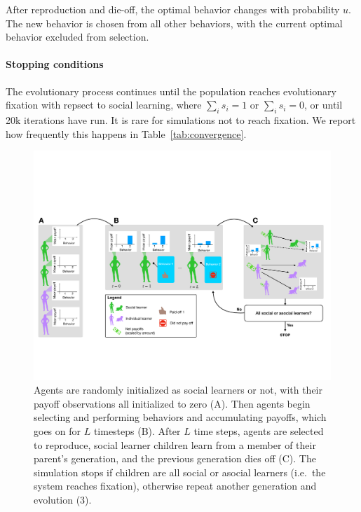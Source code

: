 \documentclass[letterpaper,11.5pt]{scrartcl}
\begin{document}
After reproduction and die-off, the optimal behavior changes with probability
$u$. The new behavior is chosen from all other behaviors, with the 
current optimal behavior excluded from selection.

\paragraph{Stopping conditions} The evolutionary process continues until the
population reaches evolutionary fixation with repsect to social learning, where
$\sum_i s_i = 1$ or $\sum_i s_i = 0$, or until 20k iterations have run. 
It is rare for simulations not to reach fixation. We report how frequently
this happens in Table~\ref{tab:convergence}.

\clearpage

\begin{figure}
  \caption{Agents are randomly initialized as social learners or not, with their
  payoff observations all initialized to zero (A). Then agents begin selecting
and performing behaviors and accumulating payoffs, which goes on for $L$
timesteps (B). After $L$ time steps, agents are selected to reproduce,
social learner children learn from a member of their parent's generation, and
the previous generation dies off (C). The simulation stops if children are all
social or asocial learners (i.e.\ the system reaches fixation), 
otherwise repeat another generation and evolution (3).}
  \label{fig:schematic}
  \centering
    \includegraphics[width=\textwidth]{Figures/IntraInterGenerationalDynamics.pdf}
\end{figure}
\end{document}
